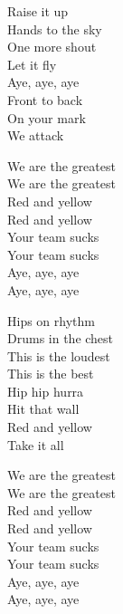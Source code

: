 \begin{lyrics}
Raise it up\\
Hands to the sky\\
One more shout\\
Let it fly\\
Aye, aye, aye\\
Front to back\\
On your mark\\
We attack

We are the greatest\\
We are the greatest\\
Red and yellow\\
Red and yellow\\
Your team sucks\\
Your team sucks\\
Aye, aye, aye\\
Aye, aye, aye

Hips on rhythm\\
Drums in the chest\\
This is the loudest\\
This is the best\\
Hip hip hurra\\
Hit that wall\\
Red and yellow\\
Take it all

We are the greatest\\
We are the greatest\\
Red and yellow\\
Red and yellow\\
Your team sucks\\
Your team sucks\\
Aye, aye, aye\\
Aye, aye, aye
\end{lyrics}

